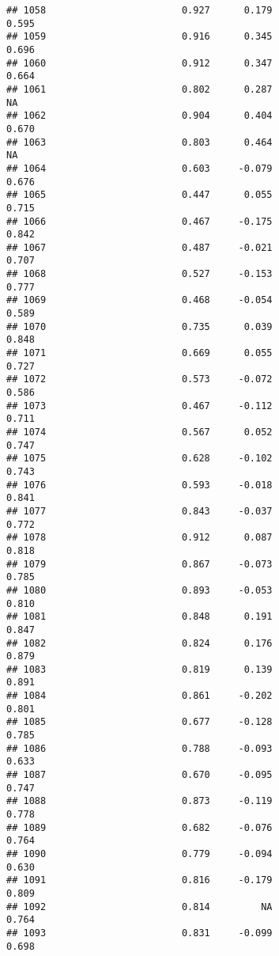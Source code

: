 \documentclass[
]{article}
\begin{document}
\begin{verbatim}
## 1058                        0.927      0.179                     0.595
## 1059                        0.916      0.345                     0.696
## 1060                        0.912      0.347                     0.664
## 1061                        0.802      0.287                        NA
## 1062                        0.904      0.404                     0.670
## 1063                        0.803      0.464                        NA
## 1064                        0.603     -0.079                     0.676
## 1065                        0.447      0.055                     0.715
## 1066                        0.467     -0.175                     0.842
## 1067                        0.487     -0.021                     0.707
## 1068                        0.527     -0.153                     0.777
## 1069                        0.468     -0.054                     0.589
## 1070                        0.735      0.039                     0.848
## 1071                        0.669      0.055                     0.727
## 1072                        0.573     -0.072                     0.586
## 1073                        0.467     -0.112                     0.711
## 1074                        0.567      0.052                     0.747
## 1075                        0.628     -0.102                     0.743
## 1076                        0.593     -0.018                     0.841
## 1077                        0.843     -0.037                     0.772
## 1078                        0.912      0.087                     0.818
## 1079                        0.867     -0.073                     0.785
## 1080                        0.893     -0.053                     0.810
## 1081                        0.848      0.191                     0.847
## 1082                        0.824      0.176                     0.879
## 1083                        0.819      0.139                     0.891
## 1084                        0.861     -0.202                     0.801
## 1085                        0.677     -0.128                     0.785
## 1086                        0.788     -0.093                     0.633
## 1087                        0.670     -0.095                     0.747
## 1088                        0.873     -0.119                     0.778
## 1089                        0.682     -0.076                     0.764
## 1090                        0.779     -0.094                     0.630
## 1091                        0.816     -0.179                     0.809
## 1092                        0.814         NA                     0.764
## 1093                        0.831     -0.099                     0.698

\end{verbatim}
\end{document}

